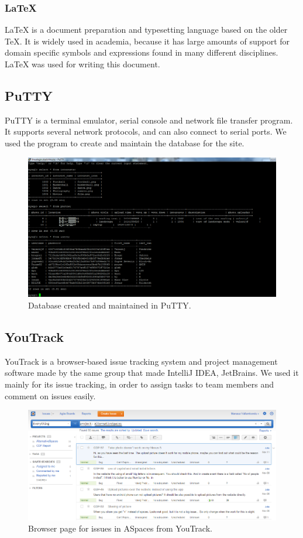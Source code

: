 \subsubsection{LaTeX} LaTeX is a document preparation and typesetting language based on the older TeX. It is widely used in academia, because it has large amounts of support for domain specific symbols and expressions found in many different disciplines. LaTeX was used for writing this document.

\subsection{PuTTY} 
\label{subsec:PlanningSoftwareDevPutty}

PuTTY is a terminal emulator, serial console and network file transfer program. It supports several network protocols, and can also connect to serial ports. We used the program to create and maintain the database for the site.

\begin{figure}
  \centering
  \includegraphics[width=\linewidth]{./Planning/img/puttydb}
  \caption{Database created and maintained in PuTTY.}
  \label{fig:PlanningSoftwareDevPutty}
\end{figure}

\subsection{YouTrack}
\label{subsec:PlanningSoftwareDevYouTrack}
YouTrack is a browser-based issue tracking system and project management software made by the same group that made IntelliJ IDEA, JetBrains. We used it mainly for its issue tracking, in order to assign tasks to team members and comment on issues easily.

\begin{figure}[ht!]
  \centering
  \includegraphics[width=\linewidth]{./Planning/img/YouTrackPage}
  \caption{Browser page for issues in ASpaces from YouTrack.}
  \label{fig:PlanningSoftwareDevYouTrack}
\end{figure}